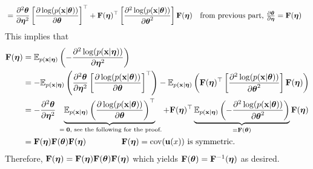 \documentclass[12pt, fullpage,letterpaper]{article}
\begin{document}
\begin{enumerate}
\begin{enumerate}
{\begin{align*}
	& = \frac{\partial^2 \boldsymbol{\theta}}{\partial \boldsymbol{\eta}^2}\left[\frac{\partial \log(p({\bf x}|\boldsymbol{\theta}))}{\partial \boldsymbol{\theta}}\right]^\top
	+ {\bf F}(\boldsymbol{\eta})^\top\left[\frac{\partial^2 \log(p({\bf x}|\boldsymbol{\theta})) }{\partial \boldsymbol{\theta}^2}\right]{\bf F}(\boldsymbol{\eta})
	\quad\mbox{from previous part, $\frac{\partial \boldsymbol{\theta}}{\partial \boldsymbol{\eta}}={\bf F}(\boldsymbol{\eta})$}
	\end{align*}
	This implies that 
	\begin{align*}
	{\bf F}(\boldsymbol{\eta})
	& =  \mathbb{E}_{p({\bf x}|\boldsymbol{\eta})}\left(-\frac{\partial^2 \log(p({\bf x}|\boldsymbol{\eta})) }{\partial \boldsymbol{\eta}^2} \right)\\
	& = -\mathbb{E}_{p({\bf x}|\boldsymbol{\eta})}\left(\frac{\partial^2 \boldsymbol{\theta}}{\partial \boldsymbol{\eta}^2}\left[\frac{\partial \log(p({\bf x}|\boldsymbol{\theta}))}{\partial \boldsymbol{\theta}}\right]^\top\right)
	-\mathbb{E}_{p({\bf x}|\boldsymbol{\eta})}\left( {\bf F}(\boldsymbol{\eta})^\top\left[\frac{\partial^2 \log(p({\bf x}|\boldsymbol{\theta})) }{\partial \boldsymbol{\theta}^2}\right]{\bf F}(\boldsymbol{\eta})\right)	\\
	& = -\frac{\partial^2 \boldsymbol{\theta}}{\partial \boldsymbol{\eta}^2}\underbrace{\mathbb{E}_{p({\bf x}|\boldsymbol{\eta})}\left(\frac{\partial \log(p({\bf x}|\boldsymbol{\theta}))}{\partial \boldsymbol{\theta}}\right)^\top}_\text{ $= \mathbf{0}$, see the following for the proof.}
	+{\bf F}(\boldsymbol{\eta})^\top\underbrace{\mathbb{E}_{p({\bf x}|\boldsymbol{\eta})}\left(-\frac{\partial^2 \log(p({\bf x}|\boldsymbol{\theta})) }{\partial \boldsymbol{\theta}^2}\right)}_{={\bf F}(\boldsymbol{\theta})}{\bf F}(\boldsymbol{\eta})\\
	& = {\bf F}(\boldsymbol{\eta})	{\bf F}(\boldsymbol{\theta}){\bf F}(\boldsymbol{\eta}) \qquad\qquad \mbox{ ${\bf F}(\boldsymbol{\eta}) =  {\rm cov}({\bf u}(x))$ is symmetric.}
	\end{align*}
	Therefore, ${\bf F}(\boldsymbol{\eta}) = {\bf F}(\boldsymbol{\eta}){\bf F}(\boldsymbol{\theta}){\bf F}(\boldsymbol{\eta})$ which yields 
	${\bf F}(\boldsymbol{\theta}) ={\bf F}^{-1}(\boldsymbol{\eta})$ as desired.
	
	\bigskip
	
}
\end{enumerate}
\end{enumerate}
\end{document}
